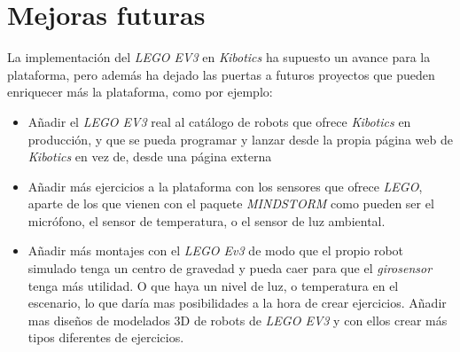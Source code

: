 \section{Mejoras futuras}
\label{sec:mejoras_futuras}

La implementación del \textit{LEGO EV3} en \textit{Kibotics} ha supuesto un avance para la plataforma, pero además ha dejado las puertas a futuros proyectos que pueden enriquecer más la plataforma, como por ejemplo:

\begin{itemize}
    \item Añadir el \textit{LEGO EV3} real al catálogo de robots que ofrece \textit{Kibotics} en producción, y que se pueda programar y lanzar desde la propia página web de \textit{Kibotics} en vez de, desde una página externa  
    \item Añadir más ejercicios a la plataforma con los sensores que ofrece \textit{LEGO}, aparte de los que vienen con el paquete \textit{MINDSTORM} como pueden ser el micrófono, el sensor de temperatura, o el sensor de luz ambiental. 
    \item Añadir más montajes con el \textit{LEGO Ev3} de modo que el propio robot simulado tenga un centro de gravedad y pueda caer para que el \textit{girosensor} tenga más utilidad. O que haya un nivel de luz, o temperatura en el escenario, lo que daría mas posibilidades a la hora de crear ejercicios. Añadir mas diseños de modelados 3D de robots de \textit{LEGO EV3} y con ellos crear más tipos diferentes de ejercicios.
 
 \end{itemize} 
